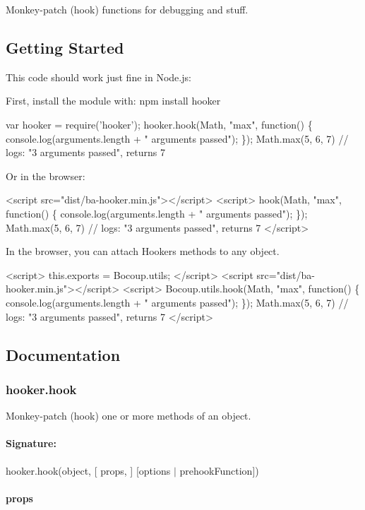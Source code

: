 Monkey-\/patch (hook) functions for debugging and stuff.

\subsection*{Getting Started}

This code should work just fine in Node.\+js\+:

First, install the module with\+: {\ttfamily npm install hooker}


\begin{DoxyCode}
var hooker = require('hooker');
hooker.hook(Math, "max", function() \{
  console.log(arguments.length + " arguments passed");
\});
Math.max(5, 6, 7) // logs: "3 arguments passed", returns 7
\end{DoxyCode}


Or in the browser\+:


\begin{DoxyCode}
<script src="dist/ba-hooker.min.js"></script>
<script>
hook(Math, "max", function() \{
  console.log(arguments.length + " arguments passed");
\});
Math.max(5, 6, 7) // logs: "3 arguments passed", returns 7
</script>
\end{DoxyCode}


In the browser, you can attach Hooker\textquotesingle{}s methods to any object.


\begin{DoxyCode}
<script>
this.exports = Bocoup.utils;
</script>
<script src="dist/ba-hooker.min.js"></script>
<script>
Bocoup.utils.hook(Math, "max", function() \{
  console.log(arguments.length + " arguments passed");
\});
Math.max(5, 6, 7) // logs: "3 arguments passed", returns 7
</script>
\end{DoxyCode}


\subsection*{Documentation}

\subsubsection*{hooker.\+hook}

Monkey-\/patch (hook) one or more methods of an object. \paragraph*{Signature\+:}

{\ttfamily hooker.\+hook(object, \mbox{[} props, \mbox{]} \mbox{[}options $\vert$ prehook\+Function\mbox{]})} \paragraph*{{\ttfamily props}}

